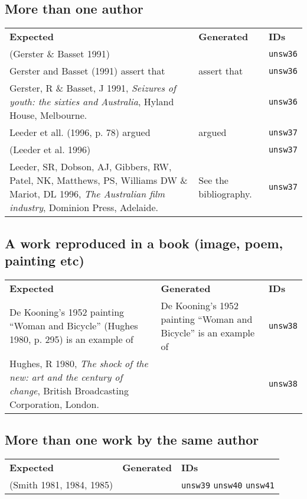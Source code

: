 \documentclass[a4paper,landscape,12pt]{article}
\newlength\q
\newlength\qr
\newenvironment{citetable}
  {\noindent\begin{longtable}{p{\q} p{\q} p{\qr}}\textbf{Expected} & \textbf{Generated} & \textbf{IDs}\\}
  {\end{longtable}}
\begin{document}
\subsection{More than one author}

\begin{citetable}
	(Gerster \& Basset 1991) & \parencite{unsw36} & \texttt{unsw36} \\
	Gerster and Basset (1991) assert that & \textcite{unsw36} assert that & \texttt{unsw36} \\
	Gerster, R \& Basset, J 1991, \textit{Seizures of youth: the sixties and Australia}, Hyland House, Melbourne. & \fullcite{unsw36} & \texttt{unsw36} \\
	Leeder et all. (1996, p. 78) argued & \textcite[p.~78]{unsw37} argued & \texttt{unsw37} \\
	(Leeder et al. 1996) & \parencite{unsw37} & \texttt{unsw37} \\
	Leeder, SR, Dobson, AJ, Gibbers, RW, Patel, NK, Matthews, PS, Williams DW \& Mariot, DL 1996, \textit{The Australian film industry}, Dominion Press, Adelaide. & See the bibliography. & \texttt{unsw37} \\
\end{citetable}

\subsection{A work reproduced in a book (image, poem, painting etc)}

\begin{citetable}
	De Kooning's 1952 painting ``Woman and Bicycle'' (Hughes 1980, p. 295) is an example of & De Kooning's 1952 painting ``Woman and Bicycle'' \parencite[p.295]{unsw38} is an example of & \texttt{unsw38} \\
	Hughes, R 1980, \textit{The shock of the new: art and the century of change}, British Broadcasting Corporation, London. & \fullcite{unsw38} & \texttt{unsw38} \\
\end{citetable}

\subsection{More than one work by the same author}

\begin{citetable}
	(Smith 1981, 1984, 1985) & \parencite{unsw39,unsw40,unsw41} & \texttt{unsw39} \texttt{unsw40} \texttt{unsw41} \\
\end{citetable}
\end{document}
